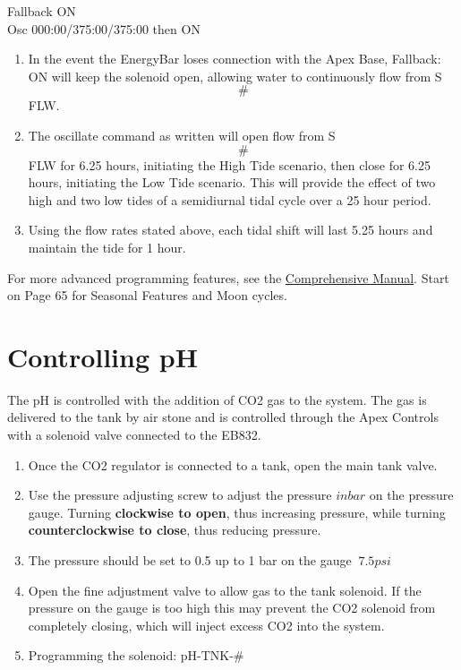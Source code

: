 \documentclass[]{book}
\providecommand{\tightlist}{%
  \setlength{\itemsep}{0pt}\setlength{\parskip}{0pt}}
\begin{document}
Fallback ON\\
Osc 000:00/375:00/375:00 then ON

\begin{enumerate}
\def\labelenumi{\arabic{enumi}.}
\tightlist
\item
  In the event the EnergyBar loses connection with the Apex Base,
  Fallback: ON will keep the solenoid open, allowing water to
  continuously flow from S\[\#\]FLW.\\
\item
  The oscillate command as written will open flow from S\[\#\]FLW for
  6.25 hours, initiating the High Tide scenario, then close for 6.25
  hours, initiating the Low Tide scenario. This will provide the effect
  of two high and two low tides of a semidiurnal tidal cycle over a 25
  hour period.\\
\item
  Using the flow rates stated above, each tidal shift will last 5.25
  hours and maintain the tide for 1 hour.
\end{enumerate}

For more advanced programming features, see the
\href{https://github.com/SilbigerLab/Mesocosm_User_Manual/tree/7503b88686aef920c4a4ed473b1efe37b34dae10/Manuals/Apex_Comprehensive_Reference_Manual.pdf}{Comprehensive
Manual}. Start on Page 65 for Seasonal Features and Moon cycles.

\chapter{Controlling pH}\label{controlling-ph}

The pH is controlled with the addition of CO2 gas to the system. The gas
is delivered to the tank by air stone and is controlled through the Apex
Controls with a solenoid valve connected to the EB832.

\begin{enumerate}
\def\labelenumi{\arabic{enumi}.}
\tightlist
\item
  Once the CO2 regulator is connected to a tank, open the main tank
  valve.
\item
  Use the pressure adjusting screw to adjust the pressure \(in bar\) on
  the pressure gauge. Turning \textbf{clockwise to open}, thus
  increasing pressure, while turning \textbf{counterclockwise to close},
  thus reducing pressure.
\item
  The pressure should be set to 0.5 up to 1 bar on the gauge \(~7.5psi\)
\item
  Open the fine adjustment valve to allow gas to the tank solenoid. If
  the pressure on the gauge is too high this may prevent the CO2
  solenoid from completely closing, which will inject excess CO2 into
  the system.
\item
  Programming the solenoid: pH-TNK-\#
\end{enumerate}
\end{document}
